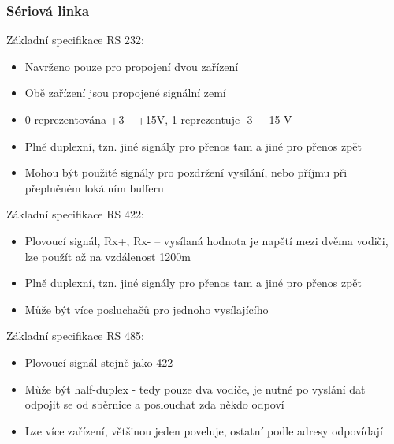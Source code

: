 \documentclass{beamer}
\begin{document}
\begin{frame}[shrink=5]
\frametitle{Sériová linka}

Základní specifikace RS 232:
\begin{itemize}
\item Navrženo pouze pro propojení dvou zařízení
\item Obě zařízení jsou propojené signální zemí
\item 0 reprezentována +3 -- +15V, 1 reprezentuje -3 -- -15 V
\item Plně duplexní, tzn. jiné signály pro přenos tam a jiné pro přenos zpět
\item Mohou být použité signály pro pozdržení vysílání, nebo příjmu při přeplněném lokálním bufferu
\end{itemize}

Základní specifikace RS 422:
\begin{itemize}
\item Plovoucí signál, Rx+, Rx- -- vysílaná hodnota je napětí mezi dvěma vodiči, lze použít až na vzdálenost 1200m
\item Plně duplexní, tzn. jiné signály pro přenos tam a jiné pro přenos zpět
\item Může být více posluchačů pro jednoho vysílajícího
\end{itemize}

Základní specifikace RS 485:
\begin{itemize}
\item Plovoucí signál stejně jako 422
\item Může být half-duplex - tedy pouze dva vodiče, je nutné po vyslání dat odpojit se od sběrnice a poslouchat zda někdo odpoví
\item Lze více zařízení, většinou jeden poveluje, ostatní podle adresy odpovídají
\end{itemize}

\end{frame}
\end{document}

